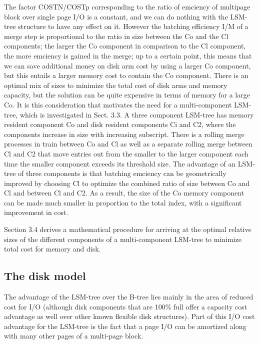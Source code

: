 \documentclass[a4paper,11pt,notitlepage,twoside,openright]{article}
\begin{document}
The factor COSTN/COSTp corresponding to the ratio of emciency of
multipage block over single page I/O is a constant, and we can do
nothing with the LSM-tree structure to have any effect on it. However
the batching efficiency I/M of a merge step is proportional to the ratio
in size between the Co and the Cl components; the larger the Co
component in comparison to the Cl component, the more emciency is gained
in the merge; up to a certain point, this means that we can save
additional money on disk arm cost by using a larger Co component, but
this entails a larger memory cost to contain the Co component. There is
an optimal mix of sizes to minimize the total cost of disk arms and
memory capacity, but the solution can be quite expensive in terms of
memory for a large Co. It is this consideration that motivates the need
for a multi-component LSM-tree, which is investigated in Sect. 3.3. A
three component LSM-tree has memory resident component Co and disk
resident components Ci and C2, where the components increase in size
with increasing subscript. There is a rolling merge processes in train
between Co and Cl as well as a separate rolling merge between Cl and C2
that move entries out from the smaller to the larger component each time
the smaller component exceeds its threshold size. The advantage of an
LSM-tree of three components is that batching emciency can be
geometrically improved by choosing Cl to optimize the combined ratio of
size between Co and Cl and between Cl and C2. As a result, the size of
the Co memory component can be made much smaller in proportion to the
total index, with a significant improvement in cost.

Section 3.4 derives a mathematical procedure for arriving at the optimal
relative sizes of the different components of a multi-component LSM-tree
to minimize total cost for memory and disk.


\hypertarget{the-disk-model}{%
\subsection{The disk model}\label{the-disk-model}}


The advantage of the LSM-tree over the B-tree lies mainly in the area of
reduced cost for I/O (although disk components that are 100\% full offer
a capacity cost advantage as well over other known flexible disk
structures). Part of this I/O cost advantage for the LSM-tree is the
fact that a page I/O can be amortized along with many other pages of a
multi-page block.
\end{document}
